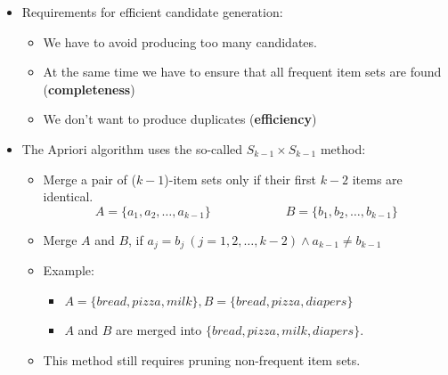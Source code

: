 \begin{frame}
	\begin{itemize}
		\item Requirements for efficient candidate generation:
		\begin{itemize}
			\item We have to avoid producing too many candidates.
			\item At the same time we have to ensure that all frequent item sets are found (\textbf{completeness})
			\item We don't want to produce duplicates (\textbf{efficiency})
		\end{itemize}
		\item The Apriori algorithm uses the so-called $S_{k-1} \times S_{k-1}$ method:
		\begin{itemize}
			\item Merge a pair of ($k - 1$)-item sets only if their first $k - 2$ items are identical.
			\begin{equation}
				A = \{ a_1, a_2, \dots, a_{k-1} \} \qquad\qquad\qquad B = \{ b_1, b_2, \dots, b_{k-1} \}
			\end{equation}
			\item Merge $A$ and $B$, if $a_j = b_j\ (j = 1, 2, \dots, k - 2) \wedge a_{k-1} \ne b_{k-1}$
			\item Example:
			\begin{itemize}
				\item $A = \{ bread, pizza, milk \}, B = \{ bread, pizza, diapers \}$
				\item $A$ and $B$ are merged into $\{ bread, pizza, milk, diapers \}$.
			\end{itemize}
			\item This method still requires pruning non-frequent item sets.
		\end{itemize}
	\end{itemize}
\end{frame}


\begin{frame}

\end{frame}


